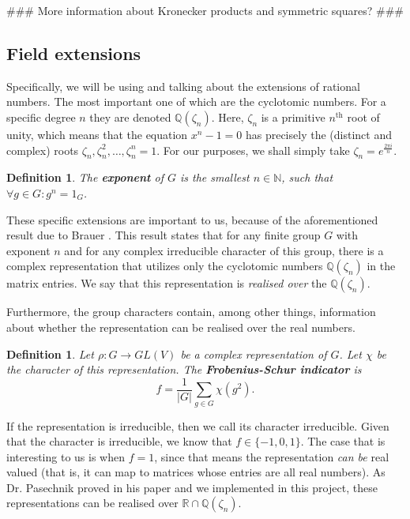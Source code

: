 \documentclass[11pt]{article}
\newtheorem{definition}[theorem]{Definition}
\begin{document}
\#\#\# More information about Kronecker products and symmetric squares? \#\#\#

\subsection{Field extensions} \label{sec:extensions}

Specifically, we will be using and talking about the extensions of rational numbers.
The most important one of which are the cyclotomic numbers. For a specific degree $n$ they are denoted $\mathbb{Q}(\zeta_n)$.
Here, $\zeta_n$ is a primitive $n^{\text{th}}$ root of unity, which means that the equation $x^n - 1 = 0$ has
precisely the (distinct and complex) roots $\zeta_n, \zeta_n^2, \ldots, \zeta_n^n = 1$. For our purposes, we
shall simply take $\zeta_n = e^{\frac{2\pi i}{n}}$.
\begin{definition} \label{def:exponent}
  The \textbf{exponent} of $G$ is the smallest $n \in \mathbb{N}$, such that $\forall g \in G: g^n = 1_G$.
\end{definition}

These specific extensions are important to us, because of the aforementioned
result due to Brauer \cite[(10.3)]{ISAACS}. This result states that for any
finite group $G$ with exponent $n$ and for any complex irreducible character of
this group, there is a complex representation that utilizes only the cyclotomic
numbers $\mathbb{Q}(\zeta_n)$ in the matrix entries. We say that this
representation is \textit{realised over} the $\mathbb{Q}(\zeta_n)$.

Furthermore, the group characters contain, among other things, information about whether the representation can
be realised over the real numbers.
\begin{definition} \label{def:fsi}
  Let $\rho: G \rightarrow GL(V)$ be a complex representation of $G$. Let $\chi$ be the character
  of this representation. The \textbf{Frobenius-Schur indicator} is
  \[f = \frac{1}{\lvert G \rvert} \sum_{g \in G}\chi(g^2).\]
\end{definition}
If the representation is irreducible, then we call its character irreducible. Given that
the character is irreducible, we know that $f \in \{-1, 0, 1\}$. The case that is interesting to
us is when $f = 1$, since that means the representation \textit{can be} real valued (that is, it can map to
matrices whose entries are all real numbers). As Dr. Pasechnik proved in his paper \cite{Pas21} and we implemented in
this project, these representations can be realised over $\mathbb{R} \cap \mathbb{Q}(\zeta_n)$.
\end{document}
